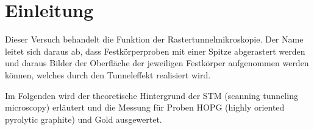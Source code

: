 \section{Einleitung}
Dieser Versuch behandelt die Funktion der Rastertunnelmikroskopie. Der Name leitet sich daraus ab, dass Festkörperproben mit einer Spitze abgerastert werden und daraus Bilder der Oberfläche der jeweiligen Festkörper aufgenommen werden können, welches durch den Tunneleffekt realisiert wird.

\noindent Im Folgenden wird der theoretische Hintergrund der STM (scanning tunneling microscopy) erläutert und die Messung für Proben HOPG (highly oriented pyrolytic graphite) und Gold ausgewertet.